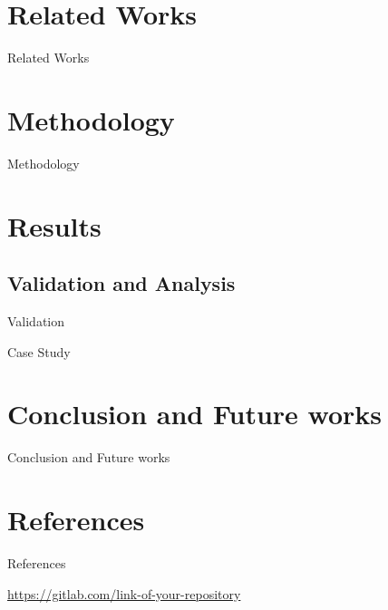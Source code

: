 \documentclass[
  xcolor={hyperref,svgnames,x11names,table},
  hyperref={pdfencoding=unicode,plainpages=false,pdfpagelabels=true,breaklinks=true},
  brazilian,english,12pt,aspectratio=149,
]{beamer}
\begin{document}
\section{Related Works}

\begin{frame}{Related Works}
\end{frame}

\section{Methodology}

\begin{frame}{Methodology}
\end{frame}

\section{Results}

\subsection{Validation and Analysis}

\begin{frame}{Validation}
\end{frame}

\begin{frame}{Case Study}
\end{frame}

\section{Conclusion and Future works}

\begin{frame}{Conclusion and Future works}
\end{frame}

\section{References}

\begin{frame}[allowframebreaks]{References}
  \nocite{bronevetsky02, schmidt03:MSc, FSF:GNU-GPL, CORBA:spec,
          MenaChalco08, natbib, biblatex, eco:09}
  \printbibliography
\end{frame}

\begin{frame}{\insertshorttitle}
  \overview

  {%
    \centering\noindent%
    \url{https://gitlab.com/link-of-your-repository}\par
  }

\end{frame}
\end{document}
